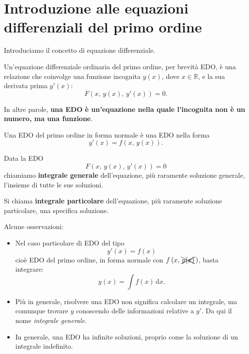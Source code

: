 \documentclass[../../dimostrazioni]{subfiles}
\begin{document}
    \chapter{Introduzione alle equazioni differenziali del primo ordine}

        Introduciamo il concetto di equazione differenziale.

        \begin{definizione}
            Un'equazione differenziale ordinaria del primo ordine, per brevità EDO, è una relazione che coinvolge una funzione incognita
            \(y(x)\), dove \(x \in \mathbb{R}\), e la sua derivata prima \(y'(x)\):
            \[
                F\left(x, \, y(x), \, y'(x)\right) = 0.
            \]

            In altre parole, \textbf{una EDO è un'equazione nella quale l'incognita non è un numero, ma una funzione}.
        \end{definizione}

        \begin{definizione}
            Una EDO del primo ordine in forma normale è una EDO nella forma
            \[
                y'(x) = f\left(x, \, y(x)\right).
            \]
        \end{definizione}

        \begin{definizione}
            Data la EDO
            \[
                F\left(x, \, y(x), \, y'(x)\right) = 0
            \]
            chiamiamo \textbf{integrale generale} dell'equazione, più raramente soluzione generale, l'insieme di tutte le sue soluzioni.

            Si chiama \textbf{integrale particolare} dell'equazione, più raramente soluzione particolare, una specifica soluzione.
        \end{definizione}

        Alcune osservazioni:
        \begin{itemize}
            \item Nel caso particolare di EDO del tipo
                \[
                    y'(x) = f(x)
                \]
                cioè EDO del primo ordine, in forma normale con \(f\left(x, \, \xcancel{y(x)} \, \right)\), basta integrare:
                \[
                    y(x) = \int \! f(x) \, \mathrm{d}x.
                \]
            \item Più in generale, risolvere una EDO non significa calcolare un integrale, ma comunque trovare \(y\) conoscendo delle
                informazioni relative a \(y'\). Da qui il nome \emph{integrale generale}.
            \item In generale, una EDO ha infinite soluzioni, proprio come la soluzione di un integrale indefinito.
        \end{itemize}
            
\end{document}
